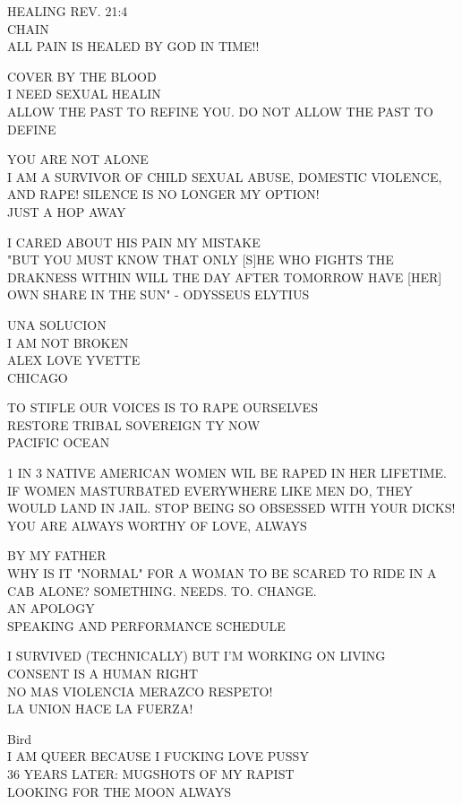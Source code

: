 \documentclass[10pt,letterpaper]{article}
\begin{document}
HEALING REV. 21:4\\
CHAIN\\
ALL PAIN IS HEALED BY GOD IN TIME!!

COVER BY THE BLOOD\\
I NEED SEXUAL HEALIN\\
ALLOW THE PAST TO REFINE YOU.  DO NOT ALLOW THE PAST TO DEFINE

YOU ARE NOT ALONE\\
I AM A SURVIVOR OF CHILD SEXUAL ABUSE, DOMESTIC VIOLENCE, AND RAPE!  SILENCE IS NO LONGER MY OPTION!\\
JUST A HOP AWAY

I CARED ABOUT HIS PAIN MY MISTAKE\\
"BUT YOU MUST KNOW THAT ONLY {[}S{]}HE WHO FIGHTS THE DRAKNESS WITHIN WILL THE DAY AFTER TOMORROW HAVE {[}HER{]} OWN SHARE IN THE SUN" {-} ODYSSEUS ELYTIUS

UNA SOLUCION\\
I AM NOT BROKEN\\
ALEX LOVE YVETTE\\
CHICAGO

TO STIFLE OUR VOICES IS TO RAPE OURSELVES\\
RESTORE TRIBAL SOVEREIGN TY NOW\\
PACIFIC OCEAN

1 IN 3 NATIVE AMERICAN WOMEN WIL BE RAPED IN HER LIFETIME.\\
IF WOMEN MASTURBATED EVERYWHERE LIKE MEN DO, THEY WOULD LAND IN JAIL.  STOP BEING SO OBSESSED WITH YOUR DICKS!\\
YOU ARE ALWAYS WORTHY OF LOVE, ALWAYS

BY MY FATHER\\
WHY IS IT "NORMAL" FOR A WOMAN TO BE SCARED TO RIDE IN A CAB ALONE?  SOMETHING.  NEEDS.  TO.  CHANGE.\\
AN APOLOGY\\
SPEAKING AND PERFORMANCE SCHEDULE

I SURVIVED (TECHNICALLY) BUT I'M WORKING ON LIVING\\
CONSENT IS A HUMAN RIGHT\\
NO MAS VIOLENCIA MERAZCO RESPETO!\\
LA UNION HACE LA FUERZA!

Bird\\
I AM QUEER BECAUSE I FUCKING LOVE PUSSY\\
36 YEARS LATER: MUGSHOTS OF MY RAPIST\\
LOOKING FOR THE MOON ALWAYS
\end{document}
